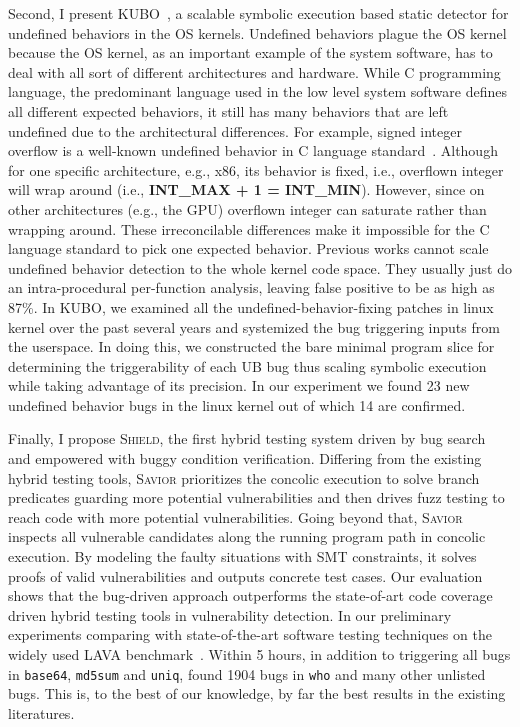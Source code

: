 Second, I present \textsc{KUBO}~\cite{kubo}, a scalable symbolic execution based static detector for undefined behaviors in the OS kernels.
Undefined behaviors plague the OS kernel because the OS kernel, as an important example of the system software, has to deal with all sort of different architectures and hardware. 
While C programming language, the predominant language used in the low level system software defines all different expected behaviors, it still has many behaviors that are left undefined due to the architectural differences. 
For example, signed integer overflow is a well-known undefined behavior in C language standard~\cite{misc:C-standard}. 
Although for one specific architecture, e.g., x86, its behavior is fixed, i.e., overflown integer will wrap around (i.e., \textbf{INT\_MAX + 1 = INT\_MIN}). 
However, since on other architectures (e.g., the GPU) overflown integer can saturate rather than wrapping around. 
These irreconcilable differences make it impossible for the C language standard to pick one expected behavior. 
Previous works cannot scale undefined behavior detection to the whole kernel code space. 
They usually just do an intra-procedural per-function analysis, leaving false positive to be as high as 87\%. 
In \textsc{KUBO}, we examined all the undefined-behavior-fixing patches in linux kernel over the past several years and systemized the bug triggering inputs from the userspace. 
In doing this, we constructed the bare minimal program slice for determining the triggerability of each UB bug thus scaling symbolic execution while taking advantage of its precision.
In our experiment we found 23 new undefined behavior bugs in the linux kernel out of which 14 are confirmed.

Finally, I propose \textsc{Shield}, the first hybrid testing system driven by bug search and empowered with buggy condition verification. 
Differing from the existing hybrid testing tools, \textsc {Savior} prioritizes the concolic execution to solve branch predicates guarding more potential vulnerabilities and then drives fuzz testing to reach code with more potential vulnerabilities. 
Going beyond that, \textsc {Savior} inspects all vulnerable candidates along the running program path in concolic execution. 
By modeling the faulty situations with SMT constraints, it solves proofs of valid vulnerabilities and outputs concrete test cases. 
Our evaluation shows that the bug-driven approach outperforms the state-of-art code coverage driven hybrid testing tools in vulnerability detection. 
In our preliminary experiments comparing \savior with state-of-the-art software testing techniques on the widely used LAVA benchmark~\cite{lava}. 
Within 5 hours, in addition to triggering all bugs in {\tt base64}, {\tt md5sum} and {\tt uniq}, \savior found 1904 bugs in {\tt who} and many other unlisted bugs. This is, to the best of our knowledge, by far the best results in the existing literatures.


